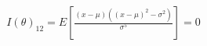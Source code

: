 \documentclass[preview]{standalone}
\begin{document}
\begin{align*}
I(\theta)_{12} = E\left[\frac{(x-\mu)((x-\mu)^2-\sigma^2)}{\sigma^5}\right] = 0
\end{align*}
\end{document}

